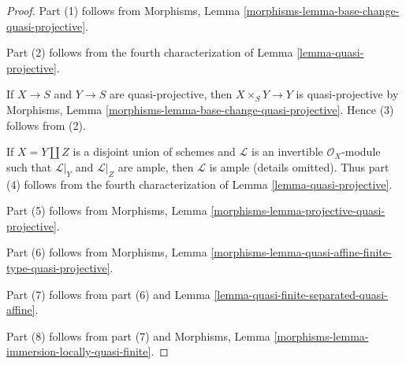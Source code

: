 \documentclass[10pt,a4paper]{amsart}
\theoremstyle{plain}
\theoremstyle{definition}
\theoremstyle{remark}
\numberwithin{equation}{subsection}
\begin{document}
\begin{proof}
Part (1) follows from Morphisms, Lemma
\ref{morphisms-lemma-base-change-quasi-projective}.

\medskip\noindent
Part (2) follows from the fourth characterization of
Lemma \ref{lemma-quasi-projective}.

\medskip\noindent
If $X \to S$ and $Y \to S$ are quasi-projective, then
$X \times_S Y \to Y$ is quasi-projective by
Morphisms, Lemma \ref{morphisms-lemma-base-change-quasi-projective}.
Hence (3) follows from (2).

\medskip\noindent
If $X = Y \amalg Z$ is a disjoint union of schemes
and $\mathcal{L}$ is an invertible $\mathcal{O}_X$-module
such that $\mathcal{L}|_Y$ and $\mathcal{L}|_Z$ are ample, then
$\mathcal{L}$ is ample (details omitted). Thus
part (4) follows from the fourth characterization of
Lemma \ref{lemma-quasi-projective}.

\medskip\noindent
Part (5) follows from
Morphisms, Lemma \ref{morphisms-lemma-projective-quasi-projective}.

\medskip\noindent
Part (6) follows from
Morphisms, Lemma
\ref{morphisms-lemma-quasi-affine-finite-type-quasi-projective}.

\medskip\noindent
Part (7) follows from part (6) and
Lemma \ref{lemma-quasi-finite-separated-quasi-affine}.

\medskip\noindent
Part (8) follows from part (7) and
Morphisms, Lemma \ref{morphisms-lemma-immersion-locally-quasi-finite}.
\end{proof}
\end{document}
